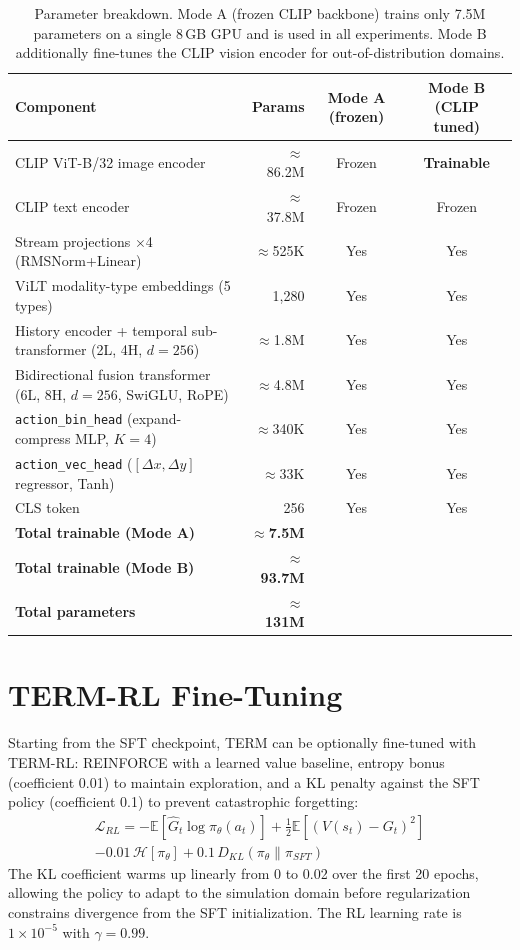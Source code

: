 \documentclass[letterpaper]{article} %
\begin{document}
\begin{table}[t]
\centering
\setlength{\tabcolsep}{4pt}
\small
\begin{tabular}{lrcc}
\toprule
\textbf{Component} & \textbf{Params} & \textbf{Mode A (frozen)} & \textbf{Mode B (CLIP tuned)} \\
\midrule
CLIP ViT-B/32 image encoder & ${\approx}$86.2M & Frozen & \textbf{Trainable} \\
CLIP text encoder & ${\approx}$37.8M & Frozen & Frozen \\
\midrule
Stream projections $\times$4 (RMSNorm+Linear) & ${\approx}$525K & Yes & Yes \\
ViLT modality-type embeddings (5 types) & 1,280 & Yes & Yes \\
History encoder + temporal sub-transformer (2L, 4H, $d{=}256$) & ${\approx}$1.8M & Yes & Yes \\
Bidirectional fusion transformer (6L, 8H, $d{=}256$, SwiGLU, RoPE) & ${\approx}$4.8M & Yes & Yes \\
\texttt{action\_bin\_head} (expand-compress MLP, $K{=}4$) & ${\approx}$340K & Yes & Yes \\
\texttt{action\_vec\_head} ($[\Delta x,\Delta y]$ regressor, Tanh) & ${\approx}$33K & Yes & Yes \\
CLS token & 256 & Yes & Yes \\
\midrule
\textbf{Total trainable (Mode A)} & ${\approx}$\textbf{7.5M} & & \\
\textbf{Total trainable (Mode B)} & ${\approx}$\textbf{93.7M} & & \\
\textbf{Total parameters} & ${\approx}$\textbf{131M} & & \\
\bottomrule
\end{tabular}
\caption{Parameter breakdown. Mode A (frozen CLIP backbone) trains only 7.5M parameters on a single 8\,GB GPU and is used in all experiments. Mode B additionally fine-tunes the CLIP vision encoder for out-of-distribution domains.}
\label{tab:params}
\end{table}

\section{TERM-RL Fine-Tuning}

Starting from the SFT checkpoint, TERM can be optionally fine-tuned with TERM-RL: REINFORCE \cite{williams1992reinforce} with a learned value baseline, entropy bonus (coefficient 0.01) to maintain exploration, and a KL penalty against the SFT policy (coefficient 0.1) to prevent catastrophic forgetting:
\begin{multline}
\mathcal{L}_{RL} = -\mathbb{E}[\hat{G}_t \log \pi_\theta(a_t)] + \tfrac{1}{2}\mathbb{E}[(V(s_t){-}G_t)^2] \\
- 0.01\,\mathcal{H}[\pi_\theta] + 0.1\,D_{KL}(\pi_\theta \| \pi_{SFT})
\end{multline}
The KL coefficient warms up linearly from 0 to 0.02 over the first 20 epochs, allowing the policy to adapt to the simulation domain before regularization constrains divergence from the SFT initialization. The RL learning rate is $1 \times 10^{-5}$ with $\gamma{=}0.99$.
\end{document}
